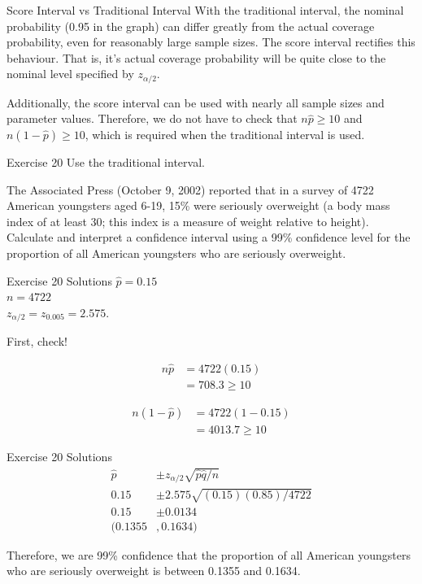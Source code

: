 \documentclass[
  ignorenonframetext,
]{beamer}
\begin{document}
\begin{frame}{Score Interval vs Traditional Interval}
\protect\hypertarget{score-interval-vs-traditional-interval}{}
With the traditional interval, the nominal probability (0.95 in the
graph) can differ greatly from the actual coverage probability, even for
reasonably large sample sizes. The score interval rectifies this
behaviour. That is, it's actual coverage probability will be quite close
to the nominal level specified by \(z_{\alpha/2}\).

Additionally, the score interval can be used with nearly all sample
sizes and parameter values. Therefore, we do not have to check that
\(n\hat{p} \geq 10\) and \(n(1-\hat{p}) \geq 10\), which is required
when the traditional interval is used.
\end{frame}

\begin{frame}{Exercise 20}
\protect\hypertarget{exercise-20-1}{}
Use the traditional interval.

The Associated Press (October 9, 2002) reported that in a survey of 4722
American youngsters aged 6-19, 15\% were seriously overweight (a body
mass index of at least 30; this index is a measure of weight relative to
height). Calculate and interpret a confidence interval using a 99\%
confidence level for the proportion of all American youngsters who are
seriously overweight.
\end{frame}

\begin{frame}{Exercise 20 Solutions}
\protect\hypertarget{exercise-20-solutions-2}{}
\(\hat{p} = 0.15\)\\
\(n = 4722\)\\
\(z_{\alpha/2} = z_{0.005} = 2.575\).

First, check!

\[
\begin{aligned}
n\hat{p} &= 4722(0.15) \\
&= 708.3 \geq 10
\end{aligned}
\]

\[
\begin{aligned}
n(1-\hat{p}) &= 4722(1-0.15) \\
&= 4013.7 \geq 10
\end{aligned}
\]
\end{frame}

\begin{frame}{Exercise 20 Solutions}
\protect\hypertarget{exercise-20-solutions-3}{}
\[ 
\begin{aligned}
\hat{p} &\pm z_{\alpha/2}\sqrt{\hat{p}\hat{q}/n} \\
0.15 &\pm 2.575\sqrt{(0.15)(0.85)/4722}\\
0.15 &\pm 0.0134 \\
(0.1355&, 0.1634)
\end{aligned}
\]

Therefore, we are 99\% confidence that the proportion of all American
youngsters who are seriously overweight is between 0.1355 and 0.1634.
\end{frame}
\end{document}
